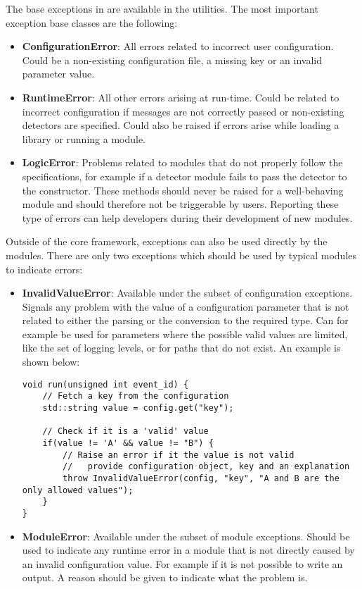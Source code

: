 The base exceptions in \apsq are available in the utilities.
The most important exception base classes are the following:
\begin{itemize}
\item \textbf{ConfigurationError}: All errors related to incorrect user configuration.
Could be a non-existing configuration file, a missing key or an invalid parameter value.
\item \textbf{RuntimeError}: All other errors arising at run-time.
Could be related to incorrect configuration if messages are not correctly passed or non-existing detectors are specified.
Could also be raised if errors arise while loading a library or running a module.
\item \textbf{LogicError}: Problems related to modules that do not properly follow the specifications, for example if a detector module fails to pass the detector to the constructor.
These methods should never be raised for a well-behaving module and should therefore not be triggerable by users.
Reporting these type of errors can help developers during their development of new modules.
\end{itemize}

Outside of the core framework, exceptions can also be used directly by the modules.
There are only two exceptions which should be used by typical modules to indicate errors:
\begin{itemize}
\item \textbf{InvalidValueError}: Available under the subset of configuration exceptions.
Signals any problem with the value of a configuration parameter that is not related to either the parsing or the conversion to the required type.
Can for example be used for parameters where the possible valid values are limited, like the set of logging levels, or for paths that do not exist.
An example is shown below:
\begin{verbatim}
void run(unsigned int event_id) {
    // Fetch a key from the configuration
    std::string value = config.get("key");

    // Check if it is a 'valid' value
    if(value != 'A' && value != "B") {
        // Raise an error if it the value is not valid
        //   provide configuration object, key and an explanation
        throw InvalidValueError(config, "key", "A and B are the only allowed values");
    }
}
\end{verbatim}
\item \textbf{ModuleError}: Available under the subset of module exceptions.
Should be used to indicate any runtime error in a module that is not directly caused by an invalid configuration value.
For example if it is not possible to write an output.
A reason should be given to indicate what the problem is.
\end{itemize}

